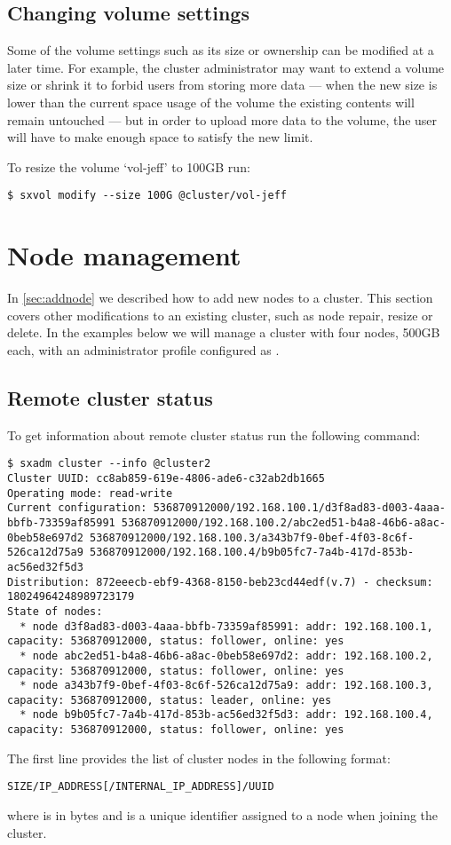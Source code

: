 \subsection{Changing volume settings}
Some of the volume settings such as its size or ownership can be
modified at a later time. For example, the cluster administrator may
want to extend a volume size or shrink it to forbid users from storing
more data --- when the new size is lower than the current space usage of
the volume the existing contents will remain untouched --- but in order
to upload more data to the volume, the user will have to make enough
space to satisfy the new limit.

To resize the volume `vol-jeff' to 100GB run:
\begin{lstlisting}
$ sxvol modify --size 100G @cluster/vol-jeff
\end{lstlisting}

\section{Node management}
In {\ifpdf{}\else\ref{sec:addnode}\fi} we described how to
add new nodes to a cluster. This
section covers other modifications to an existing cluster, such as node
repair, resize or delete. In the examples below we will manage a cluster
with four nodes, 500GB each, with an administrator profile configured
as .

\subsection{Remote cluster status}
To get information about remote cluster status run the following command:
\begin{lstlisting}
$ sxadm cluster --info @cluster2
Cluster UUID: cc8ab859-619e-4806-ade6-c32ab2db1665
Operating mode: read-write
Current configuration: 536870912000/192.168.100.1/d3f8ad83-d003-4aaa-bbfb-73359af85991 536870912000/192.168.100.2/abc2ed51-b4a8-46b6-a8ac-0beb58e697d2 536870912000/192.168.100.3/a343b7f9-0bef-4f03-8c6f-526ca12d75a9 536870912000/192.168.100.4/b9b05fc7-7a4b-417d-853b-ac56ed32f5d3 
Distribution: 872eeecb-ebf9-4368-8150-beb23cd44edf(v.7) - checksum: 18024964248989723179
State of nodes:
  * node d3f8ad83-d003-4aaa-bbfb-73359af85991: addr: 192.168.100.1, capacity: 536870912000, status: follower, online: yes
  * node abc2ed51-b4a8-46b6-a8ac-0beb58e697d2: addr: 192.168.100.2, capacity: 536870912000, status: follower, online: yes
  * node a343b7f9-0bef-4f03-8c6f-526ca12d75a9: addr: 192.168.100.3, capacity: 536870912000, status: leader, online: yes
  * node b9b05fc7-7a4b-417d-853b-ac56ed32f5d3: addr: 192.168.100.4, capacity: 536870912000, status: follower, online: yes
\end{lstlisting}
The first line provides the list of cluster nodes in the following format:
\begin{lstlisting}
SIZE/IP_ADDRESS[/INTERNAL_IP_ADDRESS]/UUID
\end{lstlisting}
where  is in bytes and  is a unique identifier assigned to a node
when joining the cluster.


